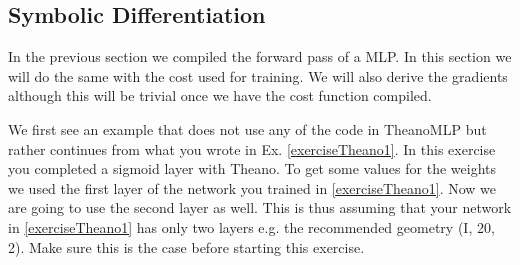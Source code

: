 \subsection{Symbolic Differentiation}
In the previous section we compiled the forward pass of a MLP. In this section
we will do the same with the cost used for training. We will also derive the
gradients although this will be trivial once we have the cost function compiled.     
\begin{exercise}
We first see an example that does not use any of the code in TheanoMLP but
rather continues from what you wrote in Ex. \ref{exerciseTheano1}. In this exercise you
completed a sigmoid layer with Theano. To get some values for the weights we
used the first layer of the network you trained in \ref{exerciseTheano1}. Now we are going to use
the second layer as well. This is thus assuming that your network in \ref{exerciseTheano1} has
only two layers e.g. the recommended geometry (I, 20, 2). Make sure this is the
case before starting this exercise.  


\end{exercise}
